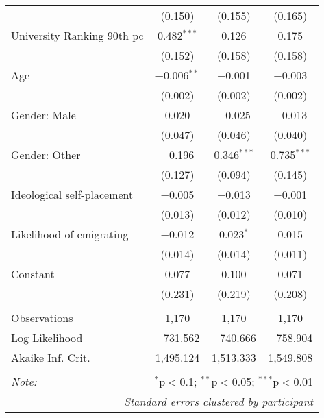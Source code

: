 \documentclass[12pt]{article}
\begin{document}
\begin{appendices}
\begin{table}[H]
\begin{tabular}{@{\extracolsep{5pt}}lccc}
  & (0.150) & (0.155) & (0.165) \\ 
  University Ranking 90th pc & 0.482$^{***}$ & 0.126 & 0.175 \\ 
  & (0.152) & (0.158) & (0.158) \\ 
  Age & $-$0.006$^{**}$ & $-$0.001 & $-$0.003 \\ 
  & (0.002) & (0.002) & (0.002) \\ 
  Gender: Male & 0.020 & $-$0.025 & $-$0.013 \\ 
  & (0.047) & (0.046) & (0.040) \\ 
  Gender: Other & $-$0.196 & 0.346$^{***}$ & 0.735$^{***}$ \\ 
  & (0.127) & (0.094) & (0.145) \\ 
  Ideological self-placement & $-$0.005 & $-$0.013 & $-$0.001 \\ 
  & (0.013) & (0.012) & (0.010) \\ 
  Likelihood of emigrating & $-$0.012 & 0.023$^{*}$ & 0.015 \\ 
  & (0.014) & (0.014) & (0.011) \\ 
  Constant & 0.077 & 0.100 & 0.071 \\ 
  & (0.231) & (0.219) & (0.208) \\ 
 \hline \\[-1.8ex] 
Observations & 1,170 & 1,170 & 1,170 \\ 
Log Likelihood & $-$731.562 & $-$740.666 & $-$758.904 \\ 
Akaike Inf. Crit. & 1,495.124 & 1,513.333 & 1,549.808 \\    
\hline 
\hline \\[-1.8ex] 
\textit{Note:}  & \multicolumn{3}{r}{$^{*}$p$<$0.1; $^{**}$p$<$0.05; $^{***}$p$<$0.01} \\
\multicolumn{4}{r}{\textit{Standard errors clustered by participant}}
\end{tabular} 
\end{table}




\end{appendices}
\end{document}
